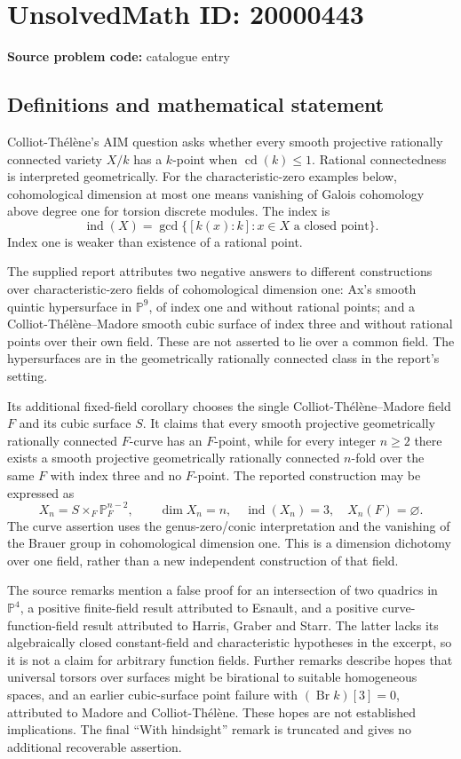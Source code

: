 \documentclass[11pt]{article}
\newcommand{\PP}{\mathbb{P}}
\begin{document}
\section*{UnsolvedMath ID: 20000443}
\textbf{Source problem code:} catalogue entry
\subsection{Definitions and mathematical statement}
Colliot-Th\'el\`ene's AIM question asks whether every smooth projective rationally connected variety $X/k$ has a $k$-point when $\operatorname{cd}(k)\leq1$. Rational connectedness is interpreted geometrically. For the characteristic-zero examples below, cohomological dimension at most one means vanishing of Galois cohomology above degree one for torsion discrete modules. The index is
\[
 \operatorname{ind}(X)=\gcd\{[k(x):k]:x\in X\text{ a closed point}\}.
\]
Index one is weaker than existence of a rational point.

The supplied report attributes two negative answers to different constructions over characteristic-zero fields of cohomological dimension one: Ax's smooth quintic hypersurface in $\PP^9$, of index one and without rational points; and a Colliot-Th\'el\`ene--Madore smooth cubic surface of index three and without rational points over their own field. These are not asserted to lie over a common field. The hypersurfaces are in the geometrically rationally connected class in the report's setting.

Its additional fixed-field corollary chooses the single Colliot-Th\'el\`ene--Madore field $F$ and its cubic surface $S$. It claims that every smooth projective geometrically rationally connected $F$-curve has an $F$-point, while for every integer $n\geq2$ there exists a smooth projective geometrically rationally connected $n$-fold over the same $F$ with index three and no $F$-point. The reported construction may be expressed as
\[
 X_n=S\times_F\PP_F^{n-2},\qquad
 \dim X_n=n,\quad\operatorname{ind}(X_n)=3,\quad X_n(F)=\varnothing.
\]
The curve assertion uses the genus-zero/conic interpretation and the vanishing of the Brauer group in cohomological dimension one. This is a dimension dichotomy over one field, rather than a new independent construction of that field.

The source remarks mention a false proof for an intersection of two quadrics in $\PP^4$, a positive finite-field result attributed to Esnault, and a positive curve-function-field result attributed to Harris, Graber and Starr. The latter lacks its algebraically closed constant-field and characteristic hypotheses in the excerpt, so it is not a claim for arbitrary function fields. Further remarks describe hopes that universal torsors over surfaces might be birational to suitable homogeneous spaces, and an earlier cubic-surface point failure with $(\operatorname{Br}k)[3]=0$, attributed to Madore and Colliot-Th\'el\`ene. These hopes are not established implications. The final ``With hindsight'' remark is truncated and gives no additional recoverable assertion.
\end{document}
